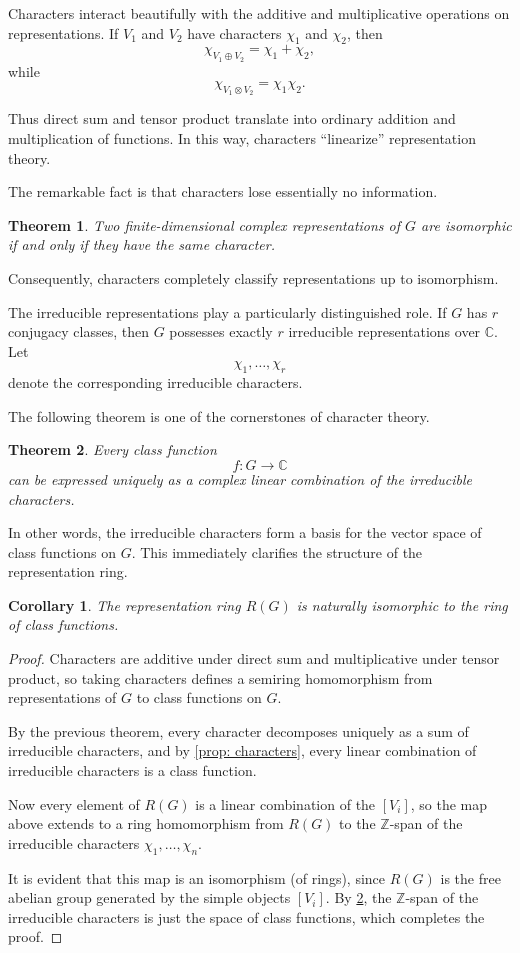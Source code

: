\documentclass[12pt,reqno]{amsart}
\theoremstyle{plain}
\newtheorem{cor}[thm]{Corollary}
\numberwithin{equation}{section}
\newtheorem{theorem}{Theorem}[section]
\begin{document}
\medskip
Characters interact beautifully with the additive and multiplicative operations on representations. If $V_1$ and $V_2$ have characters $\chi_1$ and $\chi_2$, then
\[
\chi_{V_1\oplus V_2}
=
\chi_1+\chi_2,
\]
while
\[
\chi_{V_1\otimes V_2}
=
\chi_1\chi_2.
\]

Thus direct sum and tensor product translate into ordinary addition and multiplication of functions. In this way, characters ``linearize'' representation theory.

The remarkable fact is that characters lose essentially no information.

\begin{theorem}
Two finite-dimensional complex representations of $G$ are isomorphic if and only if they have the same character.
\end{theorem}

Consequently, characters completely classify representations up to isomorphism.

The irreducible representations play a particularly distinguished role. If $G$ has $r$ conjugacy classes, then $G$ possesses exactly $r$ irreducible representations over $\mathbb C$. Let
\[
\chi_1,\dots,\chi_r
\]
denote the corresponding irreducible characters.

The following theorem is one of the cornerstones of character theory.

\begin{theorem}\label{thm: class functions}
Every class function
\[
f:G\to \mathbb C
\]
can be expressed uniquely as a complex linear combination of the irreducible characters.
\end{theorem}

In other words, the irreducible characters form a basis for the vector space of class functions on $G$.
This immediately clarifies the structure of the representation ring.

\begin{cor}
The representation ring $R(G)$ is naturally isomorphic to the ring of class functions.
\end{cor}

\begin{proof}
Characters are additive under direct sum and multiplicative under tensor product, so taking characters defines a semiring homomorphism from representations of $G$ to class functions on $G$.

By the previous theorem, every character decomposes uniquely as a sum of irreducible characters, and by \cref{prop: characters}, every linear combination of irreducible characters is a class function. 

Now every element of $R(G)$ is a linear combination of the $[V_i]$, so the map above extends to a ring homomorphism from $R(G)$ to the $\mathbb Z$-span of the irreducible characters $\chi_1,\dots, \chi_n$.

It is evident that this map is an isomorphism (of rings), since $R(G)$ is the free abelian group generated by the simple objects $[V_i]$. By \cref{thm: class functions}, the $\mathbb Z$-span of the irreducible characters is just the space of class functions, which completes the proof.
\end{proof}
\end{document}
